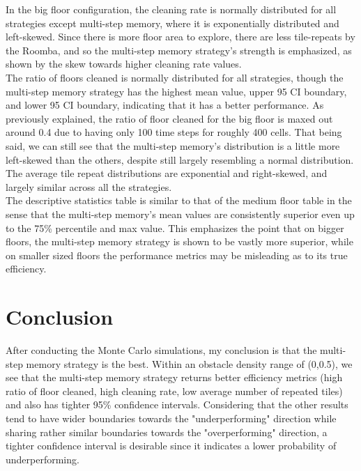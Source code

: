 \documentclass[11pt]{article}
\begin{document}
In the big floor configuration, the cleaning rate is normally
distributed for all strategies except multi-step memory, where it is
exponentially distributed and left-skewed. Since there is more floor
area to explore, there are less tile-repeats by the Roomba, and so the
multi-step memory strategy's strength is emphasized, as shown by the
skew towards higher cleaning rate values.\\

The ratio of floors cleaned is normally distributed for all strategies,
though the multi-step memory strategy has the highest mean value, upper
95 CI boundary, and lower 95 CI boundary, indicating that it has a
better performance. As previously explained, the ratio of floor cleaned
for the big floor is maxed out around 0.4 due to having only 100 time
steps for roughly 400 cells. That being said, we can still see that the
multi-step memory's distribution is a little more left-skewed than the
others, despite still largely resembling a normal distribution.\\

The average tile repeat distributions are exponential and right-skewed,
and largely similar across all the strategies.\\

The descriptive statistics table is similar to that of the medium floor
table in the sense that the multi-step memory's mean values are
consistently superior even up to the 75\% percentile and max value. This
emphasizes the point that on bigger floors, the multi-step memory
strategy is shown to be vastly more superior, while on smaller sized
floors the performance metrics may be misleading as to its true
efficiency.
\newpage
    \section{Conclusion}

After conducting the Monte Carlo simulations, my conclusion is that the
multi-step memory strategy is the best. Within an obstacle density range
of (0,0.5), we see that the multi-step memory strategy returns better
efficiency metrics (high ratio of floor cleaned, high cleaning rate, low
average number of repeated tiles) and also has tighter 95\% confidence
intervals. Considering that the other results tend to have wider
boundaries towards the "underperforming" direction while sharing rather
similar boundaries towards the "overperforming" direction, a tighter confidence interval is desirable
since it indicates a lower probability of underperforming.\\
\end{document}
